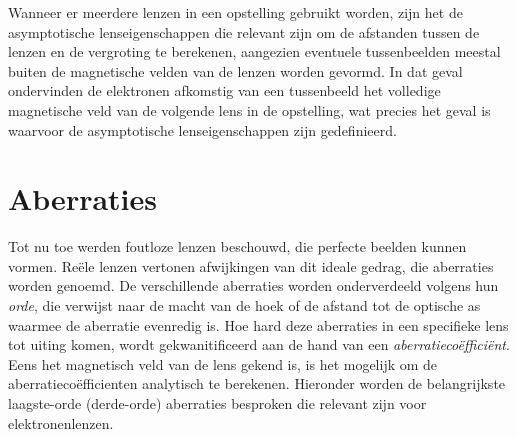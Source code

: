\documentclass[we,twoside,openright,a4paper,11pt]{uantwerpenbamathesis}
\begin{document}
Wanneer er meerdere lenzen in een opstelling gebruikt worden, zijn het de asymptotische lenseigenschappen die relevant zijn om de afstanden tussen de lenzen en de vergroting te berekenen, aangezien eventuele tussenbeelden meestal buiten de magnetische velden van de lenzen worden gevormd. In dat geval ondervinden de elektronen afkomstig van een tussenbeeld het volledige magnetische veld van de volgende lens in de opstelling, wat precies het geval is waarvoor de asymptotische lenseigenschappen zijn gedefinieerd.

\section{Aberraties}\label{ch:aberraties}
Tot nu toe werden foutloze lenzen beschouwd, die perfecte beelden kunnen vormen. Reële lenzen vertonen afwijkingen van dit ideale gedrag, die aberraties worden genoemd. De verschillende aberraties worden onderverdeeld volgens hun \textit{orde}, die verwijst naar de macht van de hoek of de afstand tot de optische as waarmee de aberratie evenredig is. Hoe hard deze aberraties in een specifieke lens tot uiting komen, wordt gekwanitificeerd aan de hand van een \textit{aberratiecoëfficiënt}. Eens het magnetisch veld van de lens gekend is, is het mogelijk om de aberratiecoëfficienten analytisch te berekenen. Hieronder worden de belangrijkste laagste-orde (derde-orde) aberraties besproken die relevant zijn voor elektronenlenzen. \cite{PWHawkes}
\end{document}
